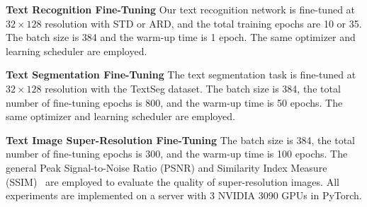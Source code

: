 \documentclass[10pt,twocolumn,letterpaper]{article}
\begin{document}
\noindent \textbf{Text Recognition Fine-Tuning}
Our text recognition network is fine-tuned at $32\times 128$ resolution with STD or ARD, and the total training epochs are 10 or 35. The batch size is 384 and the warm-up time is 1 epoch. The same optimizer and learning scheduler are employed.

\noindent \textbf{Text Segmentation Fine-Tuning}
The text segmentation task is fine-tuned at $32\times 128$ resolution with the TextSeg dataset. The batch size is 384, the total number of fine-tuning epochs is 800, and the warm-up time is 50 epochs. The same optimizer and learning scheduler are employed.

\noindent \textbf{Text Image Super-Resolution Fine-Tuning}
The batch size is 384, the total number of fine-tuning epochs is 300, and the warm-up time is 100 epochs. The general Peak Signal-to-Noise Ratio (PSNR) and Similarity Index Measure (SSIM)~\cite{superresolution} are employed to evaluate the quality of super-resolution images. All experiments are implemented on a server with 3 NVIDIA 3090 GPUs in PyTorch.
\end{document}
